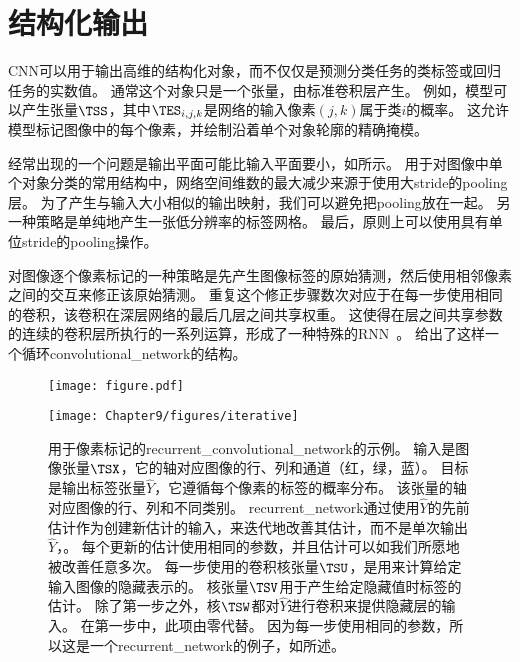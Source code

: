 \section{结构化输出}
\label{sec:structured_outputs}

\gls{CNN}可以用于输出高维的结构化对象，而不仅仅是预测分类任务的类标签或回归任务的实数值。
通常这个对象只是一个张量，由标准卷积层产生。
例如，模型可以产生张量$\TSS$，其中$\TES_{i,j,k}$是网络的输入像素$(j, k)$属于类$i$的概率。
这允许模型标记图像中的每个像素，并绘制沿着单个对象轮廓的精确掩模。

经常出现的一个问题是输出平面可能比输入平面要小，如所示。
用于对图像中单个对象分类的常用结构中，网络空间维数的最大减少来源于使用大\gls{stride}的\gls{pooling}层。
为了产生与输入大小相似的输出映射，我们可以避免把\gls{pooling}放在一起\citep{jain2007supervised}。
另一种策略是单纯地产生一张低分辨率的标签网格\citep{Pinheiro+Collobert-ICML2014,Pinheiro+Collobert-CVPR2015}。
最后，原则上可以使用具有单位\gls{stride}的\gls{pooling}操作。

对图像逐个像素标记的一种策略是先产生图像标签的原始猜测，然后使用相邻像素之间的交互来修正该原始猜测。
重复这个修正步骤数次对应于在每一步使用相同的卷积，该卷积在深层网络的最后几层之间共享权重\citep{jain2007supervised}。
这使得在层之间共享参数的连续的卷积层所执行的一系列运算，形成了一种特殊的\gls{RNN}~\citep{Pinheiro+Collobert-ICML2014,Pinheiro+Collobert-CVPR2015}。
给出了这样一个循环\gls{convolutional_network}的结构。
\begin{figure}[!htb]
\ifOpenSource
\centerline{\texttt{[image: figure.pdf]}}
\else
\centerline{\texttt{[image: Chapter9/figures/iterative]}}
\fi
\captionsetup{singlelinecheck=off}
\caption[.]{用于像素标记的\gls{recurrent_convolutional_network}的示例。
输入是图像张量$\TSX$，它的轴对应图像的行、列和通道（红，绿，蓝）。
目标是输出标签张量$\hat{Y}$，它遵循每个像素的标签的概率分布。
该张量的轴对应图像的行、列和不同类别。
\gls{recurrent_network}通过使用$\hat{Y}$的先前估计作为创建新估计的输入，来迭代地改善其估计，而不是单次输出$\hat{Y}$，。
每个更新的估计使用相同的参数，并且估计可以如我们所愿地被改善任意多次。
每一步使用的卷积核张量$\TSU$，是用来计算给定输入图像的隐藏表示的。
核张量$\TSV$用于产生给定隐藏值时标签的估计。
除了第一步之外，核$\TSW$都对$\hat{Y}$进行卷积来提供隐藏层的输入。
在第一步中，此项由零代替。
因为每一步使用相同的参数，所以这是一个\gls{recurrent_network}的例子，如所述。}
\label{fig:chap9_iterative}
\end{figure}

